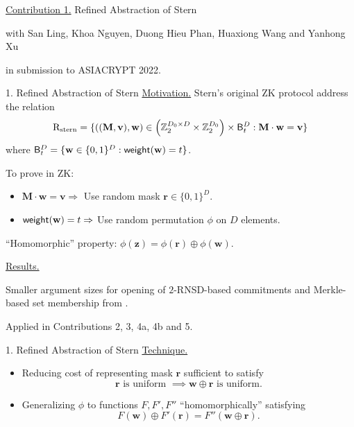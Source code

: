 \begin{frame}{}
	\underline{Contribution 1.} Refined Abstraction of Stern
	
	{\small with San Ling, Khoa Nguyen, Duong Hieu Phan, Huaxiong Wang and Yanhong Xu}
	
	in submission to ASIACRYPT 2022.
\end{frame}

\begin{frame}{1. Refined Abstraction of Stern}
	\underline{Motivation.} Stern's original ZK protocol address the relation 
	\begin{equation*}
		\mathrm{R}_{\mathrm{stern}} = \{((\mathbf{M},\mathbf{v}), \mathbf{w}) \in \left(\mathbb{Z}_2^{D_0\times D}\times \mathbb{Z}_2^{D_0}\right)\times \mathsf{B}^D_t : \mathbf{M}\cdot\mathbf{w} = \mathbf{v}\}
	\end{equation*}
	where $\mathsf{B}^D_t = \{\mathbf{w} \in \{0,1\}^D : \mathsf{weight}(\mathbf{w}) = t\}$.
	
	To prove in ZK:
	\begin{itemize}
			\item $\mathbf{M}\cdot\mathbf{w} =\mathbf{v} \Rightarrow$ Use random mask $\mathbf{r} \in \{0,1\}^D$.
			\item $\mathsf{weight}(\mathbf{w}) = t \Rightarrow$ Use random permutation $\phi$ on $D$ elements.
	\end{itemize}
	
	``Homomorphic'' property: $\phi(\mathbf{z}) = \phi(\mathbf{r}) \oplus \phi(\mathbf{w})$.
	
	\underline{Results.}
	
	Smaller argument sizes for opening of $2$-RNSD-based commitments and Merkle-based set membership from \cite{NguyenTWZ19}.
	
	Applied in Contributions 2, 3, 4a, 4b and 5.
\end{frame}

\begin{frame}{1. Refined Abstraction of Stern}
	\underline{Technique.}
	\begin{itemize}
		\item Reducing cost of representing mask $\mathbf{r}$ sufficient to satisfy 
		\begin{equation*}
			\mathbf{r} \text{ is uniform } \implies \mathbf{w} \oplus \mathbf{r} \text{ is uniform.}
		\end{equation*}  
		\item Generalizing $\phi$ to functions $F, F', F''$ ``homomorphically'' satisfying
		\begin{equation*}
			F(\mathbf{w}) \oplus F'(\mathbf{r}) = F''(\mathbf{w} \oplus \mathbf{r}).
		\end{equation*}
	\end{itemize}
\end{frame}